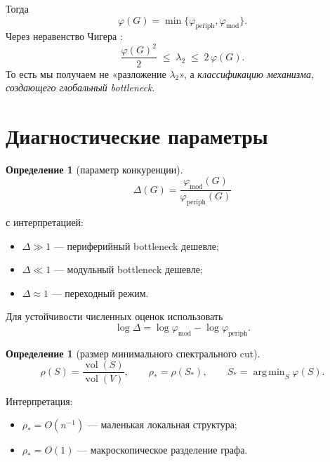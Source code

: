 \documentclass[11pt,a4paper]{article}
\theoremstyle{plain}
\theoremstyle{definition}
\newtheorem{definition}[theorem]{Определение}
\theoremstyle{remark}
\DeclareMathOperator{\vol}{vol}
\DeclareMathOperator*{\argmin}{arg\,min}
\newcommand{\periph}{\mathrm{periph}}
\newcommand{\modu}{\mathrm{mod}}
\newcommand{\Ph}{\varphi}
\newcommand{\lamtwo}{\lambda_2}
\begin{document}
Тогда
\begin{equation}
\Ph(G)=\min\{\Ph_{\periph},\Ph_{\modu}\}.
\end{equation}
Через неравенство Чигера \cite{Cheeger1970,KannanVempalaVetta2004}:
\begin{equation}
\frac{\Ph(G)^2}{2}\;\le\;\lamtwo\;\le\;2\,\Ph(G).
\label{eq:cheeger}
\end{equation}
То есть мы получаем не «разложение $\lamtwo$», а \emph{классификацию механизма,
создающего глобальный bottleneck}.

\section{Диагностические параметры}
\label{sec:diagnostics}

\begin{definition}[параметр конкуренции]
\begin{equation}
\boxed{\;\Delta(G)=\frac{\Ph_{\modu}(G)}{\Ph_{\periph}(G)}\;}
\end{equation}
\end{definition}
с интерпретацией:
\begin{itemize}[leftmargin=*]
\item $\Delta\gg 1$ --- периферийный bottleneck дешевле;
\item $\Delta\ll 1$ --- модульный bottleneck дешевле;
\item $\Delta\approx 1$ --- переходный режим.
\end{itemize}

Для устойчивости численных оценок использовать
\begin{equation}
\log\Delta=\log\Ph_{\modu}-\log\Ph_{\periph}.
\end{equation}

\begin{definition}[размер минимального спектрального cut]
\begin{equation}
\rho(S)=\frac{\vol(S)}{\vol(V)},\qquad
\rho_*=\rho(S_*),\qquad
S_*=\argmin_{S}\Ph(S).
\end{equation}
\end{definition}
Интерпретация:
\begin{itemize}[leftmargin=*]
\item $\rho_*=O(n^{-1})$ --- маленькая локальная структура;
\item $\rho_*=O(1)$ --- макроскопическое разделение графа.
\end{itemize}
\end{document}
